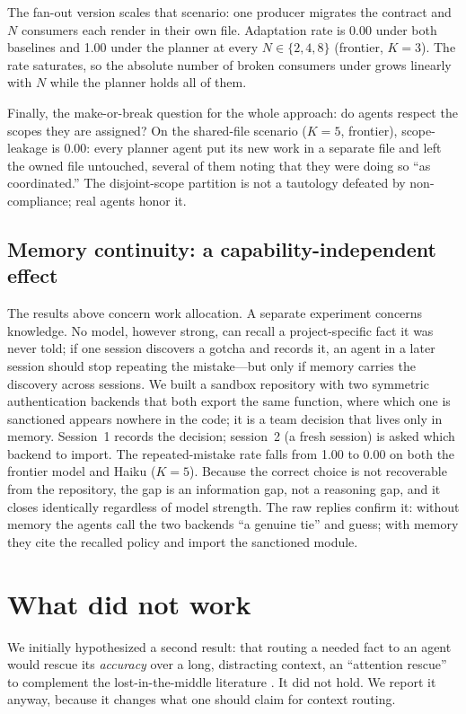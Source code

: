 The fan-out version scales that scenario: one producer migrates the contract and $N$ consumers each
render in their own file. Adaptation rate is 0.00 under both baselines and 1.00 under the planner at
every $N\in\{2,4,8\}$ (frontier, $K{=}3$). The rate saturates, so the absolute number of broken
consumers under  grows linearly with $N$ while the planner holds all of them.

Finally, the make-or-break question for the whole approach: do agents respect the scopes they are
assigned? On the shared-file scenario ($K{=}5$, frontier), scope-leakage is 0.00: every planner
agent put its new work in a separate file and left the owned file untouched, several of them noting
that they were doing so ``as coordinated.'' The disjoint-scope partition is not a tautology defeated
by non-compliance; real agents honor it.

\subsection{Memory continuity: a capability-independent effect}

The results above concern work allocation. A separate experiment concerns knowledge. No model,
however strong, can recall a project-specific fact it was never told; if one session discovers a
gotcha and records it, an agent in a later session should stop repeating the mistake---but
only if memory carries the discovery across sessions. We built a sandbox repository with two
symmetric authentication backends that both export the same function, where which one is sanctioned
appears nowhere in the code; it is a team decision that lives only in memory. Session~1 records the
decision; session~2 (a fresh session) is asked which backend to import. The repeated-mistake rate
falls from 1.00 to 0.00 on both the frontier model and Haiku ($K{=}5$). Because the correct choice
is not recoverable from the repository, the gap is an information gap, not a reasoning gap, and it
closes identically regardless of model strength. The raw replies confirm it: without memory the
agents call the two backends ``a genuine tie'' and guess; with memory they cite the recalled policy
and import the sanctioned module.

\section{What did not work}
\label{sec:negatives}

We initially hypothesized a second result: that routing a needed fact to an agent would rescue
its \emph{accuracy} over a long, distracting context, an ``attention rescue'' to complement the
lost-in-the-middle literature \citep{liu2024lost}. It did not hold. We report it anyway, because it
changes what one should claim for context routing.

